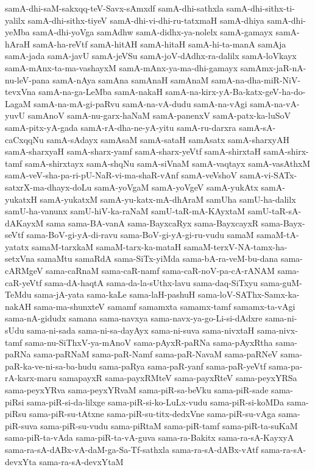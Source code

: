 {samA-dhi-saM-sakxqq-teV-Savx-sAmxdf
samA-dhi-sathxla
samA-dhi-sithx-ti-yalilx
samA-dhi-sithx-tiyeV
samA-dhi-vi-dhi-ru-tatxmaH
samA-dhiya
samA-dhi-yeMba
samA-dhi-yoVga
samAdhw
samA-didhx-ya-nolelx
samA-gamayx
samA-hAraH
samA-ha-reVtf
samA-hitAH
samA-hitaH
samA-hi-ta-manA
samAja
samA-jada
samA-javU
samA-jeVSu
samA-joV-dAdhx-ra-dalilx
samA-loVkayx
samA-mAnx-ta-ma-vashayxM
samA-mAnx-ya-ma-dhi-gamayx
samAmx-jaR-nA-nu-leV-pana
samA-nAya
samAna
samAnaH
samAnaM
samA-na-dha-miR-NiV-tevxVna
samA-na-ga-LeMba
samA-nakaH
samA-na-kirx-yA-Ba-katx-geV-ha-do-LagaM
samA-na-mA-gi-paRvu
samA-na-vA-dudu
samA-na-vAgi
samA-na-vA-yuvU
samAnoV
samA-nu-garx-haNaM
samA-panenxV
samA-patx-ka-luSoV
samA-pitx-yA-gada
samA-rA-dha-ne-yA-yitu
samA-ru-darxra
samA-sA-caCxqqNu
samA-sAdayx
samAsaM
samA-sataH
samAsatx
samA-sharxyAH
samA-sharxyaH
samA-sharx-yamf
samA-sharx-yeVtf
samA-shirxtaH
samA-shirx-tamf
samA-shirxtayx
samA-shqNu
samA-siVnaM
samA-vaqtayx
samA-vasAthxM
samA-veV-sha-pa-ri-pU-NaR-vi-ma-shaR-vAnf
samA-veVshoV
samA-vi-SATx-satxrX-ma-dhayx-doLu
samA-yoVgaM
samA-yoVgeV
samA-yukAtx
samA-yukatxH
samA-yukatxM
samA-yu-katx-mA-dhAraM
samUha
samU-ha-dalilx
samU-ha-vanunx
samU-hiV-ka-raNaM
samU-taR-mA-KAyxtaM
samU-taR-sA-dAKayxM
sama
sama-BA-vanA
sama-BayxcaRyx
sama-BayxcayxR
sama-Bayx-seVtf
sama-BoV-gi-yA-di-ravu
sama-BoV-gi-yA-gi-ru-vudu
samaM
samaM-tA-yatatx
samaM-tarxkaM
samaM-tarx-ka-mataH
samaM-terxV-NA-tamx-ha-setxVna
samaMtu
samaRdA
sama-SiTx-yiMda
sama-bA-ra-veM-bu-dana
sama-cARMgeV
sama-caRnaM
sama-caR-namf
sama-caR-noV-pa-cA-rANAM
sama-caR-yeVtf
sama-dA-haqtA
sama-da-la-sUthx-lavu
sama-daq-SiTxyu
sama-guM-TeMdu
sama-jA-yata
sama-kaLe
sama-laH-pashuH
sama-loV-SAThx-Samx-ka-nakAH
sama-ma-shunxteV
samamf
samamxta
samamx-tamf
samamx-ta-vAgi
sama-nA-gidudx
samana
sama-navxya
sama-navx-ya-go-Li-si-dAdxre
sama-ni-sUdu
sama-ni-sada
sama-ni-sa-dayAyx
sama-ni-suva
sama-nivxtaH
sama-nivx-tamf
sama-nu-SiThxV-ya-mAnoV
sama-pAyxR-paRNa
sama-pAyxRtha
sama-paRNa
sama-paRNaM
sama-paR-Namf
sama-paR-NavaM
sama-paRNeV
sama-paR-ka-ve-ni-sa-ba-hudu
sama-paRya
sama-paR-yanf
sama-paR-yeVtf
sama-pa-rA-karx-maru
samapayxR
sama-payxRMteV
sama-payxRteV
sama-peyxYRSa
sama-peyxYRva
sama-peyxYRvaM
sama-piR-sa-beVku
sama-piR-sade
sama-piRsi
sama-piR-si-da-lilxge
sama-piR-si-ko-LuLx-vudu
sama-piR-si-koMDa
sama-piRsu
sama-piR-su-tAtxne
sama-piR-su-titx-dedxVne
sama-piR-su-vAga
sama-piR-suva
sama-piR-su-vudu
sama-piRtaM
sama-piR-tamf
sama-piR-ta-suKaM
sama-piR-ta-vAda
sama-piR-ta-vA-guva
sama-ra-Bakitx
sama-ra-sA-KayxyA
sama-ra-sA-dABx-vA-daM-ga-Sa-Tf-sathxla
sama-ra-sA-dABx-vAtf
sama-ra-sA-devxYta
sama-ra-sA-devxYtaM
}
